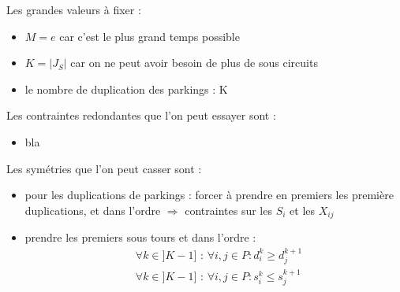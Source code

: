 \documentclass[12pt,a4paper,fleqn]{article}
\begin{document}
Les grandes valeurs à fixer :
\begin{itemize}
\item $M = e$ car c'est le plus grand temps possible
\item $K = |J_S|$ car on ne peut avoir besoin de plus de sous circuits
\item le nombre de duplication des parkings : K
\end{itemize}

\clearpage

Les contraintes redondantes que l'on peut essayer sont :
\begin{itemize}
\item bla
\end{itemize}


Les symétries que l'on peut casser sont :
\begin{itemize}
\item pour les duplications de parkings : forcer à prendre en premiers les première duplications, et dans l'ordre $\Rightarrow$ contraintes sur les $S_i$ et les $X_{ij}$
\item prendre les premiers sous tours et dans l'ordre :
\begin{align}
& \forall k \in ]K-1] \text{ : } \forall i,j \in P : d^k_i \geqslant d^{k+1}_j \label{symetriesoustours1} \\
& \forall k \in ]K-1] \text{ : } \forall i,j \in P : s^k_i \leqslant s^{k+1}_j \label{symetriesoustours2}
\end{align}
\end{itemize}
\end{document}
